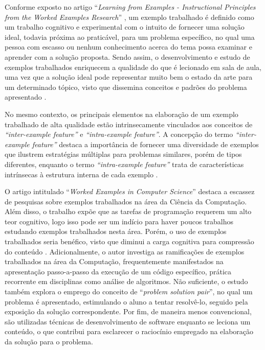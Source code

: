 Conforme exposto no artigo ``\textit{Learning from Examples - Instructional Principles from the Worked Examples Research}'' \cite{Robert.Atkinson-etal:2000}, um exemplo trabalhado é definido como um trabalho cognitivo e experimental com o intuito de fornecer uma solução ideal, todavia próxima ao praticável, para um problema específico, no qual uma pessoa com escasso ou nenhum conhecimento acerca do tema possa examinar e aprender com a solução proposta. Sendo assim, o desenvolvimento e estudo de exemplos trabalhados enriquecem a qualidade do que é lecionado em sala de aula, uma vez que a solução ideal pode representar muito bem o estado da arte para um determinado tópico, visto que dissemina conceitos e padrões do problema apresentado \cite{Robert.Atkinson-etal:2000}.

No mesmo contexto, os principais elementos na elaboração de um exemplo trabalhado de alta qualidade estão intrinsecamente vinculados aos conceitos de \textit{``inter-example feature''} e \textit{``intra-example feature''}. A concepção do termo \textit{``inter-example feature''} destaca a importância de fornecer uma diversidade de exemplos que ilustrem estratégias múltiplas para problemas similares, porém de tipos diferentes, enquanto o termo \textit{``intra-example feature''} trata de características intrínsecas à estrutura interna de cada exemplo \cite{Robert.Atkinson-etal:2000}. 

O artigo intitulado ``\textit{Worked Examples in Computer Science}'' \cite{Skudder-LuxtonReilly:2014} destaca a escassez de pesquisas sobre exemplos trabalhados na área da Ciência da Computação. Além disso, o trabalho expõe que as tarefas de programação requerem um alto teor cognitivo, logo isso pode ser um indício para haver poucos trabalhos estudando exemplos trabalhados nesta área. Porém, o uso de exemplos trabalhados seria benéfico, visto que diminui a carga cognitiva para compressão do conteúdo \cite{Robert.Atkinson-etal:2000}. Adicionalmente, o autor investiga as ramificações de exemplos trabalhados na área da Computação, frequentemente manifestados na apresentação passo-a-passo da execução de um código específico, prática recorrente em disciplinas como análise de algoritmos. Não suficiente, o estudo também explora o emprego do conceito de ``\textit{problem solution pair}'', no qual um problema é apresentado, estimulando o aluno a tentar resolvê-lo, seguido pela exposição da solução correspondente. Por fim, de maneira menos convencional, são utilizadas técnicas de desenvolvimento de software enquanto se leciona um conteúdo, o que contribui para esclarecer o raciocínio empregado na elaboração da solução para o problema.


